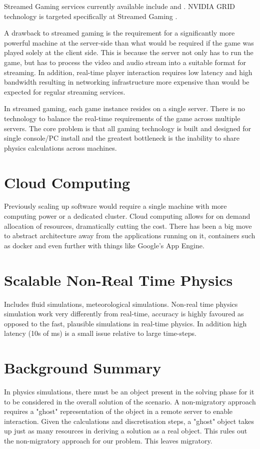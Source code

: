 Streamed Gaming services currently available include \cite{NVidiaGameStream} and \cite{PSNOW}. NVIDIA GRID technology is targeted specifically at Streamed Gaming \cite{NVIDIACloud}.

A drawback to streamed gaming is the requirement for a significantly more powerful machine at the server-side than what would be required if the game was played solely at the client side. This is because the server not only has to run the game, but has to process the video and audio stream into a suitable format for streaming. In addition, real-time player interaction requires low latency and high bandwidth resulting in networking infrastructure more expensive than would be expected for regular streaming services. 

In streamed gaming, each game instance resides on a single server. There is no technology to balance the real-time requirements of the game across multiple servers. The core problem is that all gaming technology is built and designed for single console/PC install and the greatest bottleneck is the inability to share physics calculations across machines.

\section{Cloud Computing}
Previously scaling up software would require a single machine with more computing power or a dedicated cluster. Cloud computing allows for on demand allocation of resources, dramatically cutting the cost. There has been a big move to abstract architecture away from the applications running on it, containers such as docker and even further with things like Google's App Engine.

\section{Scalable Non-Real Time Physics}
Includes fluid simulations, meteorological simulations. Non-real time physics simulation work very differently from real-time, accuracy is highly favoured as opposed to the fast, plausible simulations in real-time physics. In addition high latency (10s of ms) is a small issue relative to large time-steps.

\section{Background Summary}
In physics simulations, there must be an object present in the solving phase for it to be considered in the overall solution of the scenario. A non-migratory approach requires a "ghost" representation of the object in a remote server to enable interaction. Given the calculations and discretisation steps, a "ghost" object takes up just as many resources in deriving a solution as a real object. This rules out the non-migratory approach for our problem. This leaves migratory.

